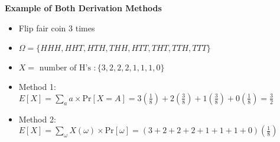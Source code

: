 \documentclass{article}\usepackage{amsmath,amssymb,amsthm,tikz,tkz-graph,color,chngpage,soul,hyperref,csquotes,graphicx,floatrow, listings}\newcommand*{\QEDB}{\hfill\ensuremath{\square}}\newtheorem*{prop}{Proposition}\renewcommand{\theenumi}{\alph{enumi}}\usepackage[shortlabels]{enumitem}\usepackage[nobreak=true]{mdframed}\usetikzlibrary{matrix,calc}\MakeOuterQuote{"}\usepackage[margin=0.75in]{geometry} \newtheorem{theorem}{Theorem}\newcommand{\Z}{\mathbb Z}\newcommand{\R}{\mathbb R}\newcommand{\Q}{\mathbb Q}\newcommand{\N}{\mathbb N}\newcommand{\x}[1]{\textrm{ #1 }}\newcommand{\pr}{\textrm{Pr}}
\newcommand{\sumlim}[3]{\sum\limits_{#1}^{#2}#3}
\begin{document}
\textbf{Example of Both Derivation Methods}
\begin{itemize}
    \item Flip fair coin 3 times
    \item $\Omega=\{HHH,HHT,HTH,THH,HTT,THT,TTH,TTT\}$
    \item $X=\x{number of H's}: \{3,2,2,2,1,1,1,0\}$
    \item Method 1: $E[X]=\sumlim{a}{}{a\times \pr[X=A]}=3(\frac{1}{8})+2(\frac{3}{8})+1(\frac{3}{8})+0(\frac{1}{8})=\frac{3}{2}$
    \item Method 2: $E[X]=\sumlim{\omega}{}{X(\omega)\times \pr[\omega]}=(3+2+2+2+1+1+1+0)(\frac{1}{8})$
\end{itemize}
\end{document}
